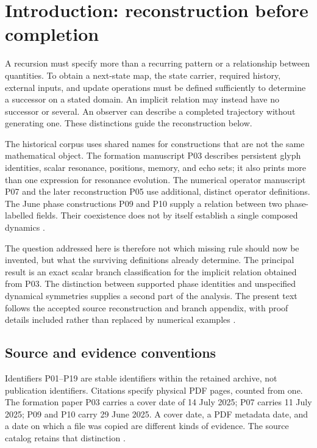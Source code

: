 \documentclass[11pt,a4paper]{article}
\theoremstyle{definition}
\numberwithin{equation}{section}
\begin{document}
\section{Introduction: reconstruction before completion}\label{sec:introduction}

A recursion must specify more than a recurring pattern or a relationship
between quantities. To obtain a next-state map, the state carrier, required
history, external inputs, and update operations must be defined sufficiently
to determine a successor on a stated domain. An implicit relation may instead
have no successor or several. An observer can describe a completed trajectory
without generating one. These distinctions guide the reconstruction below.

The historical corpus uses shared names for constructions that are not the
same mathematical object. The formation manuscript P03 describes persistent
glyph identities, scalar resonance, positions, memory, and echo sets; it also
prints more than one expression for resonance evolution. The numerical
operator manuscript P07 and the later reconstruction P05 use additional,
distinct operator definitions. The June phase constructions P09 and P10
supply a relation between two phase-labelled fields. Their coexistence does
not by itself establish a single composed dynamics
\cite[physical pp.~2--8]{P03} \cite[physical pp.~3--6]{P07}
\cite[physical pp.~1--3]{P05} \cite[physical p.~2]{P09}
\cite[physical p.~2]{P10}.

The question addressed here is therefore not which missing rule should now
be invented, but what the surviving definitions already determine. The
principal result is an exact scalar branch classification for the implicit
relation obtained from P03. The distinction between supported phase identities
and unspecified dynamical symmetries supplies a second part of the analysis.
The present text follows the accepted source reconstruction and branch
appendix, with proof details included rather than replaced by numerical
examples \cite{F01,Branch}.

\subsection{Source and evidence conventions}

Identifiers P01--P19 are stable identifiers within the retained archive, not
publication identifiers. Citations specify physical PDF pages, counted from
one. The formation paper P03 carries a cover date of 14 July 2025; P07 carries
11 July 2025; P09 and P10 carry 29 June 2025. A cover date, a PDF metadata date,
and a date on which a file was copied are different kinds of evidence. The
source catalog retains that distinction \cite{Catalog}.
\end{document}
